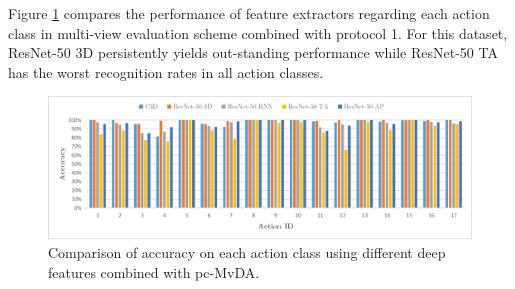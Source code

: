     \begin{table}[htbp]
    \centering
    \caption{Multi-view recognition comparison on MuHAVi dataset}
    \label{tab:muhavi_multi}
    \end{table}

    Figure \ref{fig:pc-MvDA_confusion_muhavi} compares the performance of feature extractors regarding each action class in multi-view evaluation scheme combined with protocol 1. For this dataset, ResNet-50 3D persistently yields out-standing performance while ResNet-50 TA has the worst recognition rates in all action classes.

    \begin{figure}[htbp]
        \centering
        \includegraphics[width=1.0\linewidth]{figs/pc-MvDA_confusion_muhavi.png}
        \caption{Comparison of accuracy on each action class using different deep features combined with pc-MvDA.}
        \label{fig:pc-MvDA_confusion_muhavi}
    \end{figure}

